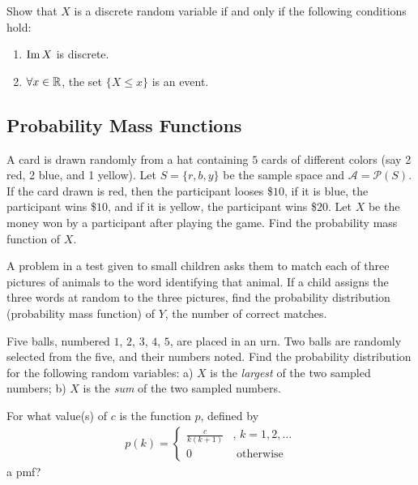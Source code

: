     \begin{problem}
    Show that $X$ is a discrete random variable if and only if the following conditions hold:
        \begin{enumerate}[label=\alph*)]
        \item $\operatorname{Im} X$ is discrete.
        \item $\forall x \in \mathbb{R}$, the set $\{ X \leq x \}$ is an event.
        \end{enumerate}
    \end{problem}

\subsection{Probability Mass Functions}

    \begin{problem}
    A card is drawn randomly from a hat containing $5$ cards of different colors (say 2 red, 2 blue, and 1 yellow). Let $S = \{ r, b, y \}$ be the sample space and $\mathcal{A} = \mathcal{P} (S)$. If the card drawn is red, then the participant looses \$$10$, if it is blue, the participant wins \$$10$, and if it is yellow, the participant wins \$$20$. Let $X$ be the money won by a participant after playing the game. Find the probability mass function of $X$.
    \end{problem}

    \begin{problem}
    A problem in a test given to small children asks them to match each of three pictures of animals to the word identifying that animal. If a child assigns the three words at random to the three pictures, find the probability distribution (probability mass function) of $Y$, the number of correct matches.
    \end{problem}

    \begin{problem}
    Five balls, numbered $1$, $2$, $3$, $4$, $5$, are placed in an urn. Two balls are randomly selected from the five, and their numbers noted. Find the probability distribution for the following random variables: a) $X$ is the \textit{largest} of the two sampled numbers; b) $X$ is the \textit{sum} of the two sampled numbers.
    \end{problem}

    \begin{problem}
    For what value(s) of $c$ is the function $p$, defined by
        \begin{align*}
        p (k) = \left\{ \begin{matrix}
        \frac{c}{k (k + 1)} & \text{, } k = 1 , 2, \ldots \\
        0 & \text{ otherwise } 
        \end{matrix}
        \right.
        \end{align*}
    a pmf?
    \end{problem}
    
